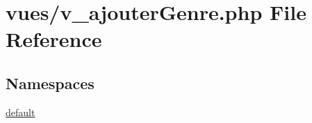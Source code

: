 \hypertarget{v__ajouter_genre_8php}{}\section{vues/v\+\_\+ajouter\+Genre.php File Reference}
\label{v__ajouter_genre_8php}
\subsection*{Namespaces}
\begin{DoxyCompactItemize}
\item 
 \hyperlink{namespacedefault}{default}
\end{DoxyCompactItemize}
